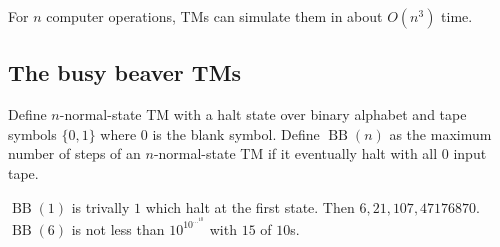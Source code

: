     For $n$ computer operations, TMs can simulate them in about $O\left( n^3 \right) $ time.
    \subsection{The busy beaver TMs}
    Define $n$-normal-state TM with a halt state over binary alphabet and tape symbols $\{0,1\}$ where $0$ is the blank symbol. Define $\operatorname{BB}\left( n \right) $ as the maximum number of steps of an $n$-normal-state TM if it eventually halt with all $0$ input tape.

    $\operatorname{BB}\left( 1 \right) $ is trivally $1$ which halt at the first state. Then $6,21,107,47176870$. $\operatorname{BB}\left( 6 \right) $ is not less than $10 ^{10 ^{\cdots ^{10}}}$ with $15$ of $10$s.

